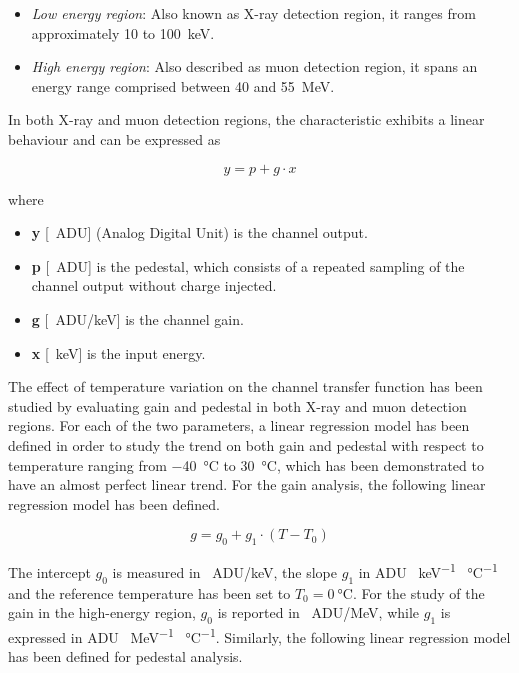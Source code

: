 \begin{itemize}
    \itemsep0em
    \item \textit{Low energy region}: Also known as X-ray detection region, it ranges from approximately 10 to \SI{100}{\kilo\electronvolt}.
    \item \textit{High energy region}: Also described as muon detection region, it spans an energy range comprised between 40 and \SI{55}{\mega\electronvolt}.
\end{itemize}

\noindent
In both X-ray and muon detection regions, the characteristic exhibits a linear behaviour and can be expressed as

\begin{equation}
    y = p + g \cdot x
    \label{FDTlinearModel}
\end{equation}

\noindent
where

\begin{itemize}
    \itemsep0em
    \item \textbf{y} [\SI{}{ADU}] (Analog Digital Unit) is the channel output.
    \item \textbf{p} [\SI{}{ADU}] is the pedestal, which consists of a repeated sampling of the channel output without charge injected.
    \item \textbf{g} [\SI{}{ADU/\kilo\electronvolt}] is the channel gain.
    \item \textbf{x} [\SI{}{\kilo\electronvolt}] is the input energy.
\end{itemize}

The effect of temperature variation on the channel transfer function has been studied by evaluating gain and pedestal in both X-ray and muon detection regions. For each of the two parameters, a linear regression model has been defined in order to study the trend on both gain and pedestal with respect to temperature ranging from \SI{-40}{\celsius} to \SI{30}{\celsius}, which has been demonstrated to have an almost perfect linear trend. For the gain analysis, the following linear regression model has been defined.

\begin{equation}
    g = g_{\textit{0}} + g_{\textit{1}} \cdot (T - T_{\textit{0}})
    \label{equationGain}
\end{equation}

\noindent
The intercept $g_{\textit{0}}$ is measured in \SI{}{ADU/\kilo\electronvolt}, the slope $g_{\textit{1}}$ in ADU \SI{}{\kilo\electronvolt^{-1}} \SI{}{\celsius^{-1}} and the reference temperature has been set to $T_{\textit{0}} = \SI{0}{\celsius}$. For the study of the gain in the high-energy region, $g_{0}$ is reported in \SI{}{ADU/\mega\electronvolt}, while $g_{1}$ is expressed in ADU \SI{}{\mega\electronvolt^{-1}} \SI{}{\celsius^{-1}}. Similarly, the following linear regression model has been defined for pedestal analysis.


